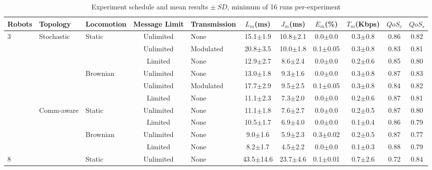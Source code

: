 \documentclass[conference]{IEEEtran}
\begin{document}
\renewcommand{\arraystretch}{0.9}  
\begin{table}[ht]
\scriptsize
\centering
\caption{Experiment schedule and mean results $\pm~SD$, minimum of 16 runs per-experiment}
\label{tab:exp_config}
\begin{tabularx}{\textwidth}{X|X|X|c|X|c|c|c|c|c|c}
\toprule
\textbf{Robots} & \textbf{Topology} & \textbf{Locomotion} & \textbf{Message Limit} & \textbf{Transmission} & $L_m$(ms) & $J_m$(ms) & $E_m$(\%) & $T_m$(Kbps) & $QoS_c$ & $QoS_s$ \\
\midrule
\multirow{10}{*}{3}
  & \multirow{5}{*}{Stochastic}
    & \multirow{2}{*}{Static}
                 & Unlimited & None      & 15.1$\pm$1.9 & 10.8$\pm$2.1 & 0.0$\pm$0.0 & 0.3$\pm$0.8 & 0.86 & 0.82 \\
  &   &          & Unlimited & Modulated & 20.8$\pm$3.5 & 10.0$\pm$1.8 & 0.1$\pm$0.05 & 0.3$\pm$0.8 & 0.83 & 0.81 \\
  &   &          & Limited   & None      & 12.9$\pm$2.7 & 8.6$\pm$2.4  & 0.0$\pm$0.0 & 0.2$\pm$0.6 & 0.85 & 0.80 \\
  \cmidrule{3-11}
  &   & \multirow{2}{*}{Brownian}
                 & Unlimited & None      & 13.0$\pm$1.8 & 9.3$\pm$1.6 & 0.0$\pm$0.0 & 0.3$\pm$0.8 & 0.87 & 0.83 \\
  &   &          & Unlimited & Modulated & 17.7$\pm$2.9 & 9.5$\pm$2.5 & 0.1$\pm$0.05 & 0.3$\pm$0.8 & 0.84 & 0.82 \\
  &   &          & Limited   & None      & 11.1$\pm$2.3 & 7.3$\pm$2.0 & 0.0$\pm$0.0 & 0.2$\pm$0.6 & 0.87 & 0.81 \\
  \cmidrule{2-11}
  & \multirow{5}{*}{Comm-aware}
    & \multirow{2}{*}{Static}
                 & Unlimited & None      & 11.1$\pm$1.8 & 7.6$\pm$2.7 & 0.0$\pm$0.0 & 0.2$\pm$0.5 & 0.87 & 0.80 \\
  &   &          & Limited   & None      & 10.5$\pm$1.7 & 6.9$\pm$4.0 & 0.0$\pm$0.0 & 0.1$\pm$0.4 & 0.86 & 0.79 \\
  \cmidrule{3-11}
  &   & \multirow{2}{*}{Brownian}
                 & Unlimited & None      & 9.0$\pm$1.6 & 5.9$\pm$2.3 & 0.3$\pm$0.02 & 0.2$\pm$0.5 & 0.87 & 0.77 \\
  &   &          & Limited   & None      & 8.2$\pm$1.7 & 4.5$\pm$2.2 & 0.0$\pm$0.0 & 0.1$\pm$0.3 & 0.88 & 0.79 \\
\midrule
\multirow{10}{*}{8}
  & \multirow{5}{*}{Stochastic}
    & \multirow{2}{*}{Static}
                 & Unlimited & None      & 43.5$\pm$14.6 & 23.7$\pm$4.6 & 0.1$\pm$0.01 & 0.7$\pm$2.6 & 0.72 & 0.84 \\

\end{tabularx}
\end{table}
\end{document}
